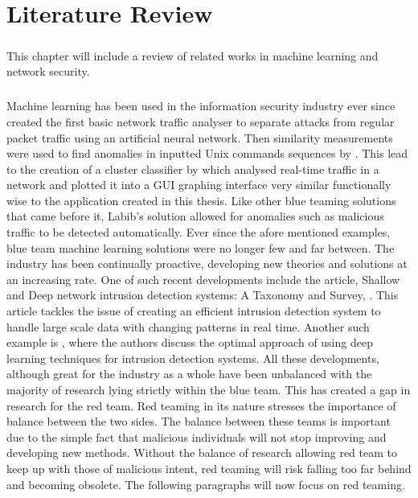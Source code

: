 \chapter{Literature Review}
\label{litreview}

\paragraph{}This chapter will include a review of related works in machine learning and network security.

\paragraph{}Machine learning has been used in the information security industry ever since \cite{debar1992neural} created the first basic network traffic analyser to separate attacks from regular packet traffic using an artificial neural network. Then similarity measurements were used to find anomalies in inputted Unix commands sequences by \cite{lane1997application}. This lead to the creation of a cluster classifier by \cite{labib2002nsom} which analysed real-time traffic in a network and plotted it into a GUI graphing interface very similar functionally wise to the application created in this thesis. Like other blue teaming solutions that came before it, Labib’s solution allowed for anomalies such as malicious traffic to be detected automatically. Ever since the afore mentioned examples, blue team machine learning solutions were no longer few and far between. The industry has been continually proactive, developing new theories and solutions at an increasing rate. One of such recent developments include the article, Shallow and Deep network intrusion detection systems: A Taxonomy and Survey, \cite{hodo2017shallow}. This article tackles the issue of creating an efficient intrusion detection system to handle large scale data with changing patterns in real time. Another such example is \cite{niyaz2016deep}, where the authors discuss the optimal approach of using deep learning techniques for intrusion detection systems. All these developments, although great for the industry as a whole have been unbalanced with the majority of research lying strictly within the blue team. This has created a gap in research for the red team. Red teaming in its nature stresses the importance of balance between the two sides. The balance between these teams is important due to the simple fact that malicious individuals will not stop improving and developing new methods. Without the balance of research allowing red team to keep up with those of malicious intent, red teaming will risk falling too far behind and becoming obsolete. The following paragraphs will now focus on red teaming.

